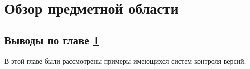 \chapter{Обзор предметной области}
\label{chapter1}







\section{Выводы по главе \ref{chapter1}}

В этой главе были рассмотрены примеры имеющихся систем контроля версий.